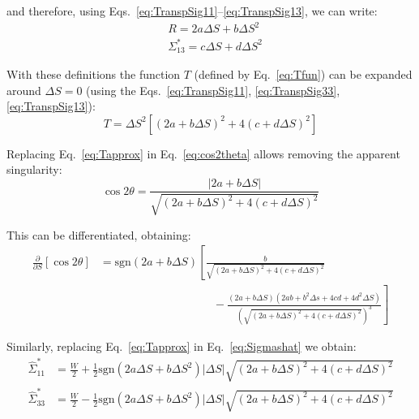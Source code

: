 and therefore, using Eqs.~\ref{eq:TranspSig11}--\ref{eq:TranspSig13}, we can write:
\begin{align}
&R = 2a \Delta S + b \Delta S^2 \label{eq:specR}\\
&\Sigma^*_{13} =c \Delta S +d \Delta S^2\label{eq:specS13}
\end{align}

With these definitions the function $T$ (defined by Eq.~\ref{eq:Tfun}) can be expanded around $\Delta S =0$ (using the Eqs.~\ref{eq:TranspSig11}, \ref{eq:TranspSig33}, \ref{eq:TranspSig13}):
\begin{equation}
T = \Delta S^2\left[\left(2a +b \Delta S \right)^2 +4\left( c +d \Delta S\right)^2\right]
\label{eq:Tapprox}
\end{equation}

Replacing Eq.~\ref{eq:Tapprox} in Eq.~\ref{eq:cos2theta} allows  removing the apparent singularity:
\begin{equation}
\cos 2 \theta = \frac{\left| 2a+b \Delta S\right|}{\sqrt{\left(2a +b \Delta S \right)^2 +4\left( c +d \Delta S\right)^2}}
\label{eq:cost_spc}
\end{equation}

This can be differentiated, obtaining:
\begin{align}
\frac{\partial }{\partial S} \left[ \cos 2\theta \right] &= \mathrm{sgn}(2a+b \Delta S)\left[
\frac{b}{\sqrt{\left(2a +b \Delta S \right)^2 +4\left( c +d \Delta S\right)^2}}
\right. \nonumber \\  &\left. \qquad \qquad \qquad \qquad \qquad
-\frac{(2a+b\Delta S)(2ab+b^2 \Delta s +4 c d+ 4 d^2 \Delta S)}{\left(\sqrt{\left(2a +b \Delta S \right)^2 +4\left( c +d \Delta S\right)^2}\right)^3}
\right]
\end{align}

Similarly, replacing Eq.~\ref{eq:Tapprox} in Eq.~\ref{eq:Sigmashat} we obtain:
\begin{align}
\hat{\Sigma}^*_{11} &= \frac{W}{2} + \frac{1}{2} \mathrm{sgn}\left(2a\Delta S + b \Delta S^2\right)\left| \Delta S\right| \sqrt{\left(2a +b \Delta S \right)^2 +4\left( c +d \Delta S\right)^2}\\
\hat{\Sigma}^*_{33} &= \frac{W}{2} - \frac{1}{2} \mathrm{sgn}\left(2a\Delta S + b \Delta S^2\right)\left| \Delta S\right| \sqrt{\left(2a +b \Delta S \right)^2 +4\left( c +d \Delta S\right)^2}\label{eq:SigmasSing}
\end{align}

